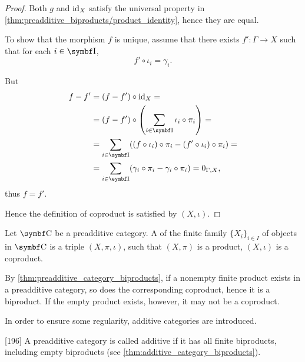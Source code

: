 \begin{proof}
  Both \( g \) and \( \operatorname{id}_X \) satisfy the universal property in \cref{thm:preadditive_biproducts/product_identity}, hence they are equal.

  To show that the morphism \( f \) is unique, assume that there exists \( f': \Gamma \to X \) such that for each \( i \in \Cat{I} \),
  \begin{equation*}
    f' \circ \iota_i = \gamma_i.
  \end{equation*}

  But
  \begin{align*}
    f - f'
    &=
    (f - f') \circ \Id_X
    = \\ &=
    (f - f') \circ \left( \sum_{i \in \Cat{I}} \iota_i \circ \pi_i \right)
    = \\ &=
    \sum_{i \in \Cat{I}} ((f \circ \iota_i) \circ \pi_i - (f' \circ \iota_i) \circ \pi_i)
    = \\ &=
    \sum_{i \in \Cat{I}} (\gamma_i \circ \pi_i - \gamma_i \circ \pi_i)
    =
    0_{\Gamma,X},
  \end{align*}
  thus \( f = f' \).

  Hence the definition of coproduct is satisfied by \( (X, \iota) \).
\end{proof}

\begin{definition}\label{def:categorical_biproduct}
  Let \( \Bold C \) be a preadditive category. A  of the finite family \( \{ X_i \}_{i \in I} \) of objects in \( \Cat{C} \) is a triple \( (X, \pi, \iota) \), such that \( (X, \pi) \) is a product, \( (X, \iota) \) is a coproduct.
\end{definition}

\begin{remark}\label{remark:preadditive_category_biproducts}
  By \cref{thm:preadditive_category_biproducts}, if a nonempty finite product exists in a preadditive category, so does the corresponding coproduct, hence it is a biproduct. If the empty product exists, however, it may not be a coproduct.

  In order to ensure some regularity, additive categories are introduced.
\end{remark}

\begin{definition}\label{def:additive_category}\cite{MacLane1994}[196]
  A preadditive category is called additive if it has all finite biproducts, including empty biproducts (see \cref{thm:additive_category_biproducts}).
\end{definition}

